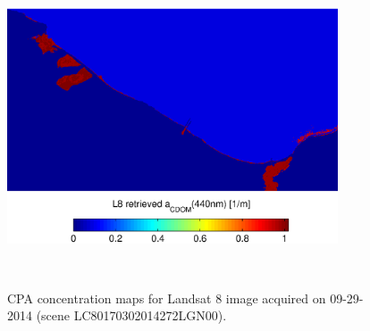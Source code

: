 \documentclass[onecolumn,3p,letterpaper]{elsarticle}
\begin{document}
\begin{figure}[htbp!]
  \begin{minipage}[c]{1.0\linewidth}
  		\centering
      \includegraphics[trim=0 0 0 30,clip,height=7cm]{./Images/CDOMmap140929_150420}  
  \end{minipage}\\

  \caption{CPA concentration maps for Landsat 8 image acquired on 09-29-2014 (scene LC80170302014272LGN00).\label{fig:CPAsMaps140929} } 
\end{figure}





\end{document}
